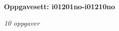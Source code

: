 \centerline{\bf Oppgavesett: i01201no-i01210no}
\vskip 10pt
\centerline{\it 10 oppgaver}\vskip 10pt
\vskip 10pt
